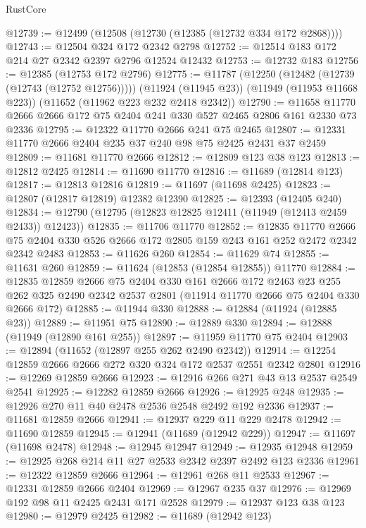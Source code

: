 \begin{lexlean}{RustCore}
\begin{coremodule}
@12739 := @12499 (@12508 (@12730 (@12385 (@12732 @334 @172 @2868))))
@12743 := @12504 @324 @172 @2342 @2798
@12752 := @12514 @183 @172 @214 @27 @2342 @2397 @2796 @12524 @12432
@12753 := @12732 @183
@12756 := @12385 (@12753 @172 @2796)
@12775 := @11787
    (@12250 (@12482 (@12739 (@12743 (@12752 @12756)))))
    (@11924 (@11945 @23))
    (@11949 (@11953 @11668 @223))
    (@11652 (@11962 @223 @232 @2418 @2342))
@12790 := @11658 @11770 @2666 @2666 @172 @75 @2404 @241 @330 @527 @2465 @2806 @161 @2330 @73 @2336
@12795 := @12322 @11770 @2666 @241 @75 @2465
@12807 := @12331 @11770 @2666 @2404 @235 @37 @240 @98 @75 @2425 @2431 @37 @2459
@12809 := @11681 @11770 @2666
@12812 := @12809 @123 @38 @123
@12813 := @12812 @2425
@12814 := @11690 @11770
@12816 := @11689 (@12814 @123)
@12817 := @12813 @12816
@12819 := @11697 (@11698 @2425)
@12823 := @12807 (@12817 @12819) @12382 @12390
@12825 := @12393 (@12405 @240)
@12834 := @12790 (@12795 (@12823 @12825 @12411 (@11949 (@12413 @2459 @2433)) @12423))
@12835 := @11706 @11770
@12852 := @12835
    @11770
    @2666
    @75
    @2404
    @330
    @526
    @2666
    @172
    @2805
    @159
    @243
    @161
    @252
    @2472
    @2342
    @2342
    @2483
@12853 := @11626 @260
@12854 := @11629 @74
@12855 := @11631 @260
@12859 := @11624 (@12853 (@12854 @12855)) @11770
@12884 := @12835
    @12859
    @2666
    @75
    @2404
    @330
    @161
    @2666
    @172
    @2463
    @23
    @255
    @262
    @325
    @2490
    @2342
    @2537
    @2801
    (@11914 @11770 @2666 @75 @2404 @330 @2666 @172)
@12885 := @11944 @330
@12888 := @12884 (@11924 (@12885 @23))
@12889 := @11951 @75
@12890 := @12889 @330
@12894 := @12888 (@11949 (@12890 @161 @255))
@12897 := @11959 @11770 @75 @2404
@12903 := @12894 (@11652 (@12897 @255 @262 @2490 @2342))
@12914 := @12254 @12859 @2666 @2666 @272 @320 @324 @172 @2537 @2551 @2342 @2801
@12916 := @12269 @12859 @2666
@12923 := @12916 @266 @271 @43 @13 @2537 @2549 @2541
@12925 := @12282 @12859 @2666
@12926 := @12925 @248
@12935 := @12926 @270 @11 @40 @2478 @2536 @2548 @2492 @192 @2336
@12937 := @11681 @12859 @2666
@12941 := @12937 @229 @11 @229 @2478
@12942 := @11690 @12859
@12945 := @12941 (@11689 (@12942 @229))
@12947 := @11697 (@11698 @2478)
@12948 := @12945 @12947
@12949 := @12935 @12948
@12959 := @12925 @268 @214 @11 @27 @2533 @2342 @2397 @2492 @123 @2336
@12961 := @12322 @12859 @2666
@12964 := @12961 @268 @11 @2533
@12967 := @12331 @12859 @2666 @2404
@12969 := @12967 @235 @37
@12976 := @12969 @192 @98 @11 @2425 @2431 @171 @2528
@12979 := @12937 @123 @38 @123
@12980 := @12979 @2425
@12982 := @11689 (@12942 @123)

\end{coremodule}
\end{lexlean}
